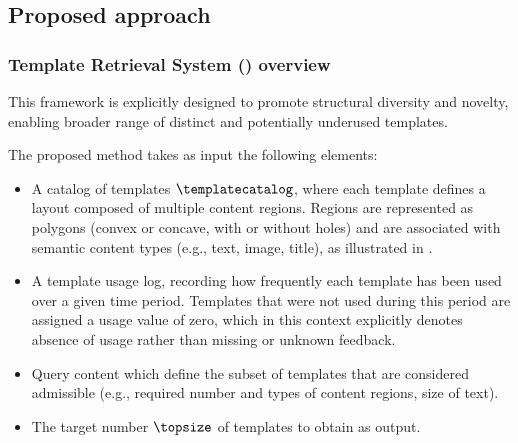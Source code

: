 \subsection{Proposed approach}




\subsubsection{Template Retrieval System (\trs) overview}
This framework is explicitly designed to promote structural diversity and novelty, enabling  broader range of distinct and potentially underused templates.

The proposed method takes as input the following elements:
\begin{itemize}
    \item A catalog of  templates $\templatecatalog$, where each template defines a layout composed of multiple content regions. Regions are represented as polygons (convex or concave, with or without holes) and are associated with semantic content types (e.g., text, image, title), as illustrated in .
    
    \item A template usage log, recording how frequently each template has been used over a given time period. Templates that were not used during this period are assigned a usage value of zero, which in this context explicitly denotes absence of usage rather than missing or unknown feedback.
    
    \item Query content which define the subset of templates that are considered admissible (e.g., required number and types of content regions, size of text).
    
    \item The target number $\topsize$ of templates to obtain as output.
\end{itemize}

